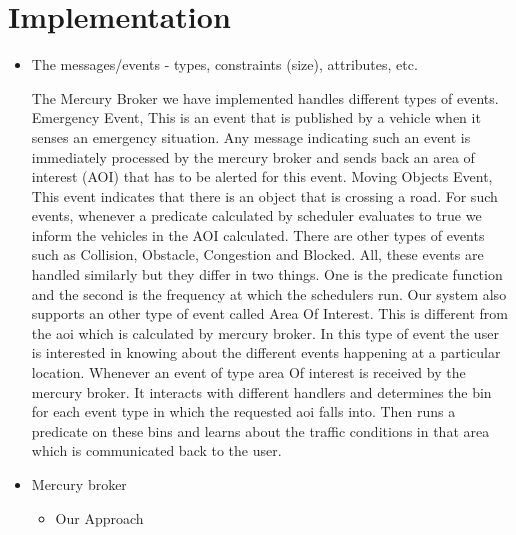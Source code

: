 \section*{Implementation}

\begin{itemize}
\item The messages/events - types, constraints (size), attributes, etc.

The Mercury Broker we have implemented handles different types of events. 
Emergency Event, This is an event that is published by a vehicle when it senses
an emergency situation. Any message indicating such an event is immediately 
processed by the mercury broker and sends back an area of interest (AOI)
that has to be alerted for this event.
Moving Objects Event, This event indicates that there is an object that is 
crossing a road. For such events, whenever a predicate calculated by scheduler 
evaluates to true we inform the vehicles in the AOI calculated.
There are other types of events such as Collision, Obstacle, Congestion and 
Blocked. All, these events are handled similarly but they differ in two things.
One is the predicate function and the second is the frequency at which the 
schedulers run. Our system also supports an other type of event called 
Area Of Interest. This is different from the aoi which is calculated by
mercury broker. In this type of event the user is interested in knowing about 
the different events happening at a particular location. Whenever an event of 
type area Of interest is received by the mercury broker. It interacts with 
different handlers and determines the bin for each event type in which the 
requested aoi falls into. Then runs a predicate on these bins and learns about 
the traffic conditions in that area which is communicated back to the user.

\item Mercury broker
  \begin{itemize}
  \item Our Approach
  

\end{itemize}
\end{itemize}
